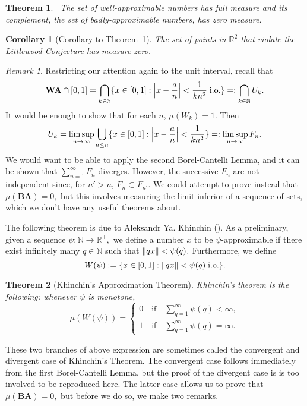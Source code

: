 \documentclass[12pt, letterpaper, oneside]{book}
\newcommand{\R}{\mathbb{R}}
\newcommand{\N}{\mathbb{N}}
\DeclarePairedDelimiter{\abs}{\lvert}{\rvert}
\DeclarePairedDelimiter{\norm}{\lVert}{\rVert}
\DeclarePairedDelimiter{\set}{\lbrace}{\rbrace}
\theoremstyle{plain}
\newtheorem{theorem}{Theorem}
\newtheorem{corollary}{Corollary}
\theoremstyle{definition}
\theoremstyle{remark}
\newtheorem*{remark}{Remark}
\begin{document}
 \begin{theorem}~\label{thm: measure_ba}
 The set of well-approximable numbers has full measure and its complement, the set of badly-approximable numbers, has zero measure.
 \end{theorem}
 \begin{corollary}[Corollary to Theorem~\ref{thm: measure_ba}]
 The set of points in $\R^2$ that violate the Littlewood Conjecture has measure zero.
 \end{corollary}
\begin{remark}
Restricting our attention again to the unit interval, recall that 
\[
\mathbf{WA}\cap[0,1] = \bigcap_{k \in \N} \set{x \in [0,1] : \abs*{x - \frac{a}{n}} < \frac{1}{kn^2}\;\mbox{i.o.}} =: \bigcap_{k \in \N}U_k.
\]
It would be enough to show that for each $n$, $\mu(W_k) = 1.$ Then 
\[
U_k = \limsup \limits_{n \to \infty} \bigcup_{a \leq n} \set{x \in [0,1] : \abs*{x - \frac{a}{n}} < \frac{1}{kn^2}} =: \limsup \limits_{n \to \infty} F_n.
\]
We would want to be able to apply the second Borel-Cantelli Lemma, and it can be shown that $\sum_{n=1}^\infty F_n$ diverges. However, the successive $F_n$ are not independent since, for $n' > n$, $F_n \subset F_{n'}.$ We could attempt to prove instead that $\mu(\mathbf{BA}) = 0,$ but this involves measuring the limit inferior of a sequence of sets, which we don't have any useful theorems about.  
\end{remark}
The following theorem is due to Aleksandr Ya. Khinchin (\cite{BRV16}). As a preliminary, given a sequence $\psi : \N \to \R^+,$ we define a number $x$ to be $\psi$-approximable if there exist infinitely many $q \in \N$ such that $\norm{qx} < \psi(q).$ Furthermore, we define
\[
W(\psi) := \set{x \in [0,1] : \norm{qx} <  \psi(q)\;\mbox{i.o.}}.
\]

\begin{theorem}[Khinchin's Approximation Theorem]
Khinchin's theorem is the following: whenever $\psi$ is monotone, 
\[
\mu(W(\psi)) = 
\begin{cases}
0 \quad \mbox{if}\quad \sum_{q=1}^\infty \psi(q) < \infty,\\
1 \quad \mbox{if} \quad \sum_{q=1}^\infty \psi(q) = \infty.
\end{cases}
\]
\end{theorem}

These two branches of above expression are sometimes called the convergent and divergent case of Khinchin's Theorem. The convergent case follows immediately from the first Borel-Cantelli Lemma, but the proof of the divergent case is is too involved to be reproduced here. The latter case allows us to prove that $\mu(\mathbf{BA}) = 0,$ but before we do so, we make two remarks. 
\end{document}
